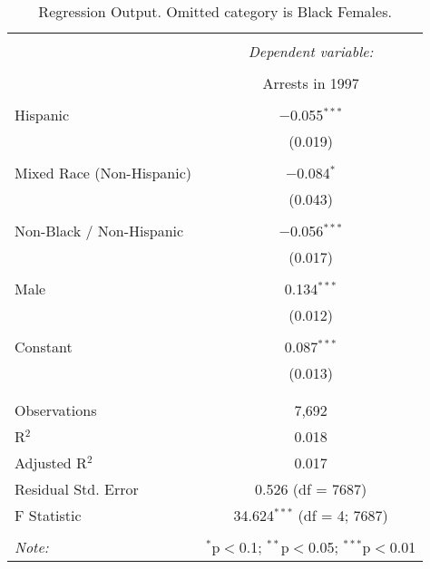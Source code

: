 
\begin{table}[!htbp] \centering 
  \caption{Regression Output. Omitted category is Black Females.} 
  \label{tab:regression} 
\begin{tabular}{@{\extracolsep{5pt}}lc} 
\\[-1.8ex]\hline 
\hline \\[-1.8ex] 
 & \multicolumn{1}{c}{\textit{Dependent variable:}} \\ 
\cline{2-2} 
\\[-1.8ex] & Arrests in 1997 \\ 
\hline \\[-1.8ex] 
 Hispanic & $-$0.055$^{***}$ \\ 
  & (0.019) \\ 
  & \\ 
 Mixed Race (Non-Hispanic) & $-$0.084$^{*}$ \\ 
  & (0.043) \\ 
  & \\ 
 Non-Black / Non-Hispanic & $-$0.056$^{***}$ \\ 
  & (0.017) \\ 
  & \\ 
 Male & 0.134$^{***}$ \\ 
  & (0.012) \\ 
  & \\ 
 Constant & 0.087$^{***}$ \\ 
  & (0.013) \\ 
  & \\ 
\hline \\[-1.8ex] 
Observations & 7,692 \\ 
R$^{2}$ & 0.018 \\ 
Adjusted R$^{2}$ & 0.017 \\ 
Residual Std. Error & 0.526 (df = 7687) \\ 
F Statistic & 34.624$^{***}$ (df = 4; 7687) \\ 
\hline 
\hline \\[-1.8ex] 
\textit{Note:}  & \multicolumn{1}{r}{$^{*}$p$<$0.1; $^{**}$p$<$0.05; $^{***}$p$<$0.01} \\ 
\end{tabular} 
\end{table} 
